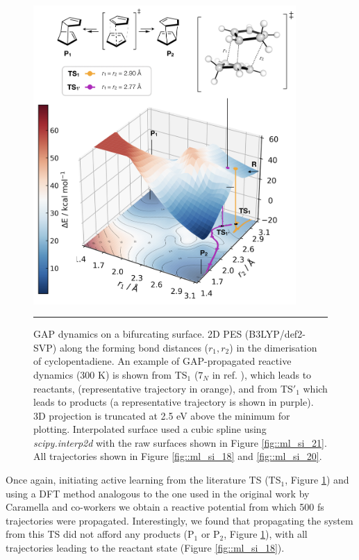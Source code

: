 \documentclass[../../main.tex]{subfiles}
\begin{document}
\begin{figure}[h!]
	\vspace{0.4cm}
	\centering
	\includegraphics[width=10cm]{6/gap/figs_ms/fig6}
	\vspace{0.2cm}
	\hrule
	\caption{GAP dynamics on a bifurcating surface. 2D PES (B3LYP/def2-SVP) along the forming bond distances ($r_1, r_2$) in the dimerisation of cyclopentadiene. An example of GAP-propagated reactive dynamics (300 K) is shown from TS${}_1$ ($7_N$ in ref. \cite{Caramella2002}), which leads to reactants, (representative trajectory in orange), and from TS${}'_1$ which leads to products (a representative trajectory is shown in purple). 3D projection is truncated at 2.5 eV above the minimum for plotting. Interpolated surface used a cubic spline using \emph{scipy.interp2d} with the raw surfaces shown in Figure \ref{fig::ml_si_21}. All trajectories shown in Figure \ref{fig::ml_si_18} and \ref{fig::ml_si_20}.}
	\label{fig::ml_6}
\end{figure}

Once again, initiating active learning from the literature TS (TS${}_1$, Figure \ref{fig::ml_6}) and using a DFT method analogous to the one used in the original work by Caramella and co-workers we obtain a reactive potential from which 500 fs trajectories were propagated. Interestingly, we found that propagating the system from this TS did not afford any products (P${}_1$ or P${}_2$, Figure \ref{fig::ml_6}), with all trajectories leading to the reactant state (Figure \ref{fig::ml_si_18}).
\end{document}
